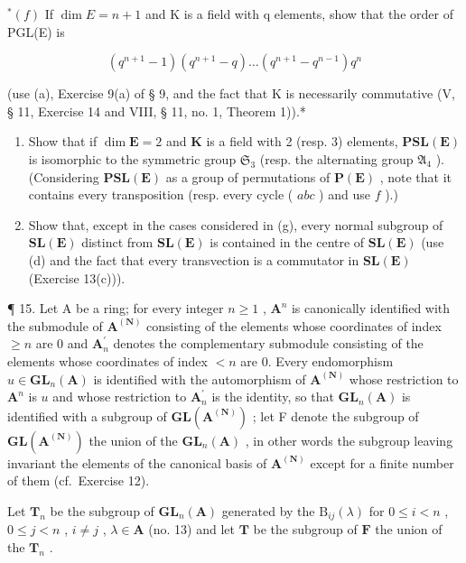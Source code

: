 \(^{*}(f)\) If \(\dim E = n + 1\) and K is a field with q elements, show that the order of PGL(E) is

\[
(q ^ {n + 1} - 1) (q ^ {n + 1} - q) \dots (q ^ {n + 1} - q ^ {n - 1}) q ^ {n}
\]

(use (a), Exercise 9(a) of § 9, and the fact that K is necessarily commutative (V, § 11, Exercise 14 and VIII, § 11, no. 1, Theorem 1)).*

\begin{enumerate}
\def\labelenumi{(\alph{enumi})}
\setcounter{enumi}{6}
\item
  Show that if \(\dim \mathbf{E} = 2\) and \(\mathbf{K}\) is a field with 2 (resp. 3) elements, \(\mathbf{PSL}(\mathbf{E})\) is isomorphic to the symmetric group \(\mathfrak{S}_3\) (resp. the alternating group \(\mathfrak{A}_4\) ). (Considering \(\mathbf{PSL}(\mathbf{E})\) as a group of permutations of \(\mathbf{P}(\mathbf{E})\) , note that it contains every transposition (resp. every cycle ( \(a b c\) ) and use \(f\) ).)
\item
  Show that, except in the cases considered in (g), every normal subgroup of \(\mathbf{SL}(\mathbf{E})\) distinct from \(\mathbf{SL}(\mathbf{E})\) is contained in the centre of \(\mathbf{SL}(\mathbf{E})\) (use (d) and the fact that every transvection is a commutator in \(\mathbf{SL}(\mathbf{E})\) (Exercise 13(c))).
\end{enumerate}

¶ 15. Let A be a ring; for every integer \(n \geqslant 1\) , \(\mathbf{A}^{n}\) is canonically identified with the submodule of \(\mathbf{A}^{(\mathbf{N})}\) consisting of the elements whose coordinates of index \(\geqslant n\) are 0 and \(\mathbf{A}_{n}^{\prime}\) denotes the complementary submodule consisting of the elements whose coordinates of index \(<n\) are 0. Every endomorphism \(u \in \mathbf{GL}_{n}(\mathbf{A})\) is identified with the automorphism of \(\mathbf{A}^{(\mathbf{N})}\) whose restriction to \(\mathbf{A}^{n}\) is \(u\) and whose restriction to \(\mathbf{A}_{n}^{\prime}\) is the identity, so that \(\mathbf{GL}_{n}(\mathbf{A})\) is identified with a subgroup of \(\mathbf{GL}(\mathbf{A}^{(\mathbf{N})})\) ; let F denote the subgroup of \(\mathbf{GL}(\mathbf{A}^{(\mathbf{N})})\) the union of the \(\mathbf{GL}_{n}(\mathbf{A})\) , in other words the subgroup leaving invariant the elements of the canonical basis of \(\mathbf{A}^{(\mathbf{N})}\) except for a finite number of them (cf.~Exercise 12).

Let \(\mathbf{T}_n\) be the subgroup of \(\mathbf{GL}_n(\mathbf{A})\) generated by the \(\mathrm{B}_{ij}(\lambda)\) for \(0 \leqslant i < n\) , \(0 \leqslant j < n\) , \(i \neq j\) , \(\lambda \in \mathbf{A}\) (no. 13) and let \(\mathbf{T}\) be the subgroup of \(\mathbf{F}\) the union of the \(\mathbf{T}_n\) .

